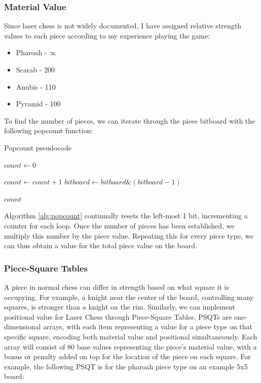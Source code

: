 \documentclass[../main/main.tex]{subfiles}
\begin{document}
\subsubsection*{Material Value}
Since laser chess is not widely documented, I have assigned relative strength values to each piece according to my experience playing the game:

\begin{itemize}
\item Pharoah - $\infty$
\item Scarab - 200
\item Anubis - 110
\item Pyramid - 100
\end{itemize}

To find the number of pieces, we can iterate through the piece bitboard with the following popcount function:

\begin{algorithm}[H]
\caption{Popcount pseudocode}
\label{alg:popcount}
\begin{algorithmic}
    \State $count \gets 0$

        \State $count \gets count + 1$
        \State $bitboard \gets bitboard \& (bitboard - 1)$
    \EndWhile

    \State \Return $count$
    \EndFunction
\end{algorithmic}
\end{algorithm}

Algorithm \ref{alg:popcount} continually resets the left-most 1 bit, incrementing a counter for each loop. Once the number of pieces has been established, we multiply this number by the piece value. Repeating this for every piece type, we can thus obtain a value for the total piece value on the board.

\subsubsection*{Piece-Square Tables}
A piece in normal chess can differ in strength based on what square it is occupying. For example, a knight near the center of the board, controlling many squares, is stronger than a knight on the rim. Similarly, we can implement positional value for Laser Chess through Piece-Square Tables. PSQTs are one-dimensional arrays, with each item representing a value for a piece type on that specific square, encoding both material value and positional simultaneously. Each array will consist of 80 base values representing the piece’s material value, with a bonus or penalty added on top for the location of the piece on each square. For example, the following PSQT is for the pharoah piece type on an example 5x5 board:
\end{document}

